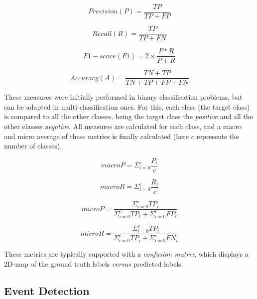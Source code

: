 \begin{equation}
\label{eq:precision}
Precision (P) = \frac{TP}{TP+FP}
\end{equation}

\begin{equation}
\label{eq:recall}
Recall (R) = \frac{TP}{TP+FN}
\end{equation}

\begin{equation}
\label{eq:f1_score}
F1-score (F1) = 2 \times \frac{P*R}{P+R}
\end{equation}

\begin{equation}
\label{eq:accuracy}
Accuracy (A) = \frac{TN+TP}{TN+TP+FP+FN}
\end{equation}

These measures were initially performed in binary classification problems, but can be adapted in multi-classification ones. For this, each class (the target class) is compared to all the other classes, being the target class the \textit{positive} and all the other classes \textit{negative}. All measures are calculated for each class, and a macro and micro average of these metrics is finally calculated (here $c$ represents the number of classes).

\begin{equation}
macroP = \Sigma_{i=0}^c \frac{P_i}{c}
\end{equation}

\begin{equation}
macroR = \Sigma_{i=0}^c \frac{R_i}{c}
\end{equation}

\begin{equation}
microP = \frac{\Sigma_{i=0}^c TP_i}{\Sigma_{i=0}^c TP_i + \Sigma_{i=0}^c FP_i}
\end{equation}

\begin{equation}
microR = \frac{\Sigma_{i=0}^c TP_i}{\Sigma_{i=0}^c TP_i + \Sigma_{i=0}^c FN_i}
\end{equation}

These metrics are typically supported with a \textit{confusion matrix}, which displays a 2D-map of the ground truth labels \textit{versus} predicted labels.

\subsection{Event Detection}
\label{subsec:event_metrics}

